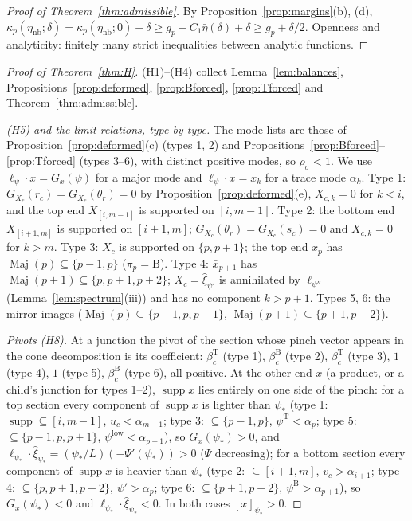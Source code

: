 \documentclass[11pt,a4paper]{report}
\newcommand{\Ts}{\mathrm T}
\newcommand{\Bs}{\mathrm B}
\newcommand{\Maj}{\operatorname{Maj}}
\newcommand{\supp}{\operatorname{supp}}
\begin{document}
\begin{proof}[Proof of Theorem~\ref{thm:admissible}]
By Proposition~\ref{prop:margins}(b), (d), \(\kappa_p(\eta_{\mathrm{nb}};\delta)=\kappa_p(\eta_{\mathrm{nb}};0)+\delta\ge g_p-C_1\bar\eta(\delta)+\delta\ge g_p+\delta/2\).
Openness and analyticity: finitely many strict inequalities between analytic functions.
\end{proof}

\begin{proof}[Proof of Theorem~\ref{thm:H}]
(H1)--(H4) collect Lemma~\ref{lem:balances}, Propositions~\ref{prop:deformed}, \ref{prop:Bforced}, \ref{prop:Tforced} and
Theorem~\ref{thm:admissible}.

\emph{(H5) and the limit relations, type by type.} The mode lists are those of Proposition~\ref{prop:deformed}(c) (types 1, 2) and
Propositions~\ref{prop:Bforced}--\ref{prop:Tforced} (types 3--6), with distinct positive modes, so \(\rho_\sigma<1\). We use
\(\ell_\psi\cdot x=G_x(\psi)\) for a major mode and \(\ell_\psi\cdot x=x_k\) for a trace mode \(\alpha_k\).
Type 1: \(G_{X_c}(r_c)=G_{X_c}(\theta_r)=0\) by Proposition~\ref{prop:deformed}(e), \(X_{c,k}=0\) for \(k<i\), and the top end
\(X_{[i,m-1]}\) is supported on \([i,m-1]\).
Type 2: the bottom end \(X_{[i+1,m]}\) is supported on \([i+1,m]\); \(G_{X_c}(\theta_r)=G_{X_c}(s_c)=0\) and \(X_{c,k}=0\) for \(k>m\).
Type 3: \(X_c\) is supported on \(\{p,p+1\}\); the top end \(\bar x_p\) has \(\Maj(p)\subseteq\{p-1,p\}\) (\(\pi_p=\Bs\)).
Type 4: \(\bar x_{p+1}\) has \(\Maj(p+1)\subseteq\{p,p+1,p+2\}\); \(X_c=\hat\xi_{\psi'}\) is annihilated by \(\ell_{\psi''}\) (Lemma~\ref{lem:spectrum}(iii))
and has no component \(k>p+1\).
Types 5, 6: the mirror images (\(\Maj(p)\subseteq\{p-1,p,p+1\}\), \(\Maj(p+1)\subseteq\{p+1,p+2\}\)).

\emph{Pivots (H8).} At a junction the pivot of the section whose pinch vector appears in the cone decomposition is its
coefficient: \(\beta^\Ts_c\) (type 1), \(\beta^\Bs_c\) (type 2), \(\beta^\Ts_c\) (type 3), \(1\) (type 4), \(1\) (type 5), \(\beta^\Bs_c\) (type 6), all
positive. At the other end \(x\) (a product, or a child's junction for types 1--2), \(\supp x\) lies entirely on one side of the pinch:
for a top section every component of \(\supp x\) is lighter than \(\psi_*\) (type 1: \(\supp\subseteq[i,m-1]\), \(u_c<\alpha_{m-1}\); type 3:
\(\subseteq\{p-1,p\}\), \(\psi^\Ts<\alpha_p\); type 5: \(\subseteq\{p-1,p,p+1\}\), \(\psi^{\mathrm{low}}<\alpha_{p+1}\)), so \(G_x(\psi_*)>0\), and
\(\ell_{\psi_*}\cdot\hat\xi_{\psi_*}=(\psi_*/L)(-\Psi'(\psi_*))>0\) (\(\Psi\) decreasing); for a bottom section every component of \(\supp x\) is
heavier than \(\psi_*\) (type 2: \(\subseteq[i+1,m]\), \(v_c>\alpha_{i+1}\); type 4: \(\subseteq\{p,p+1,p+2\}\), \(\psi'>\alpha_p\); type 6:
\(\subseteq\{p+1,p+2\}\), \(\psi^\Bs>\alpha_{p+1}\)), so \(G_x(\psi_*)<0\) and \(\ell_{\psi_*}\cdot\hat\xi_{\psi_*}<0\). In both cases \([x]_{\psi_*}>0\).


\end{proof}
\end{document}
